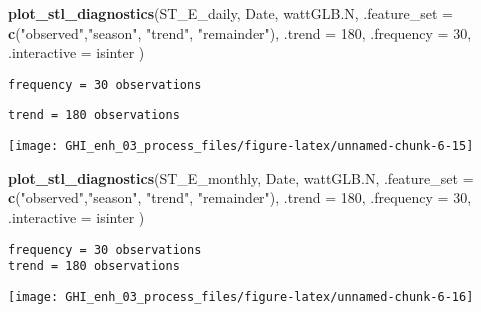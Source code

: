 \documentclass[
  10pt,
  a4paper,oneside]{article}
\newenvironment{Shaded}{\begin{snugshade}}{\end{snugshade}}
\newcommand{\AttributeTok}[1]{\textcolor[rgb]{0.13,0.29,0.53}{#1}}
\newcommand{\DecValTok}[1]{\textcolor[rgb]{0.00,0.00,0.81}{#1}}
\newcommand{\FunctionTok}[1]{\textcolor[rgb]{0.13,0.29,0.53}{\textbf{#1}}}
\newcommand{\NormalTok}[1]{#1}
\newcommand{\StringTok}[1]{\textcolor[rgb]{0.31,0.60,0.02}{#1}}
\begin{document}
\begin{Shaded}
\begin{Highlighting}[]
\FunctionTok{plot\_stl\_diagnostics}\NormalTok{(ST\_E\_daily, Date, wattGLB.N,}
                     \AttributeTok{.feature\_set =} \FunctionTok{c}\NormalTok{(}\StringTok{"observed"}\NormalTok{,}\StringTok{"season"}\NormalTok{, }\StringTok{"trend"}\NormalTok{, }\StringTok{"remainder"}\NormalTok{),}
                     \AttributeTok{.trend =} \DecValTok{180}\NormalTok{,}
                     \AttributeTok{.frequency =} \DecValTok{30}\NormalTok{,}
                     \AttributeTok{.interactive =}\NormalTok{ isinter}
\NormalTok{                     )}
\end{Highlighting}
\end{Shaded}

\begin{verbatim}
frequency = 30 observations
\end{verbatim}

\begin{verbatim}
trend = 180 observations
\end{verbatim}

\begin{center}\texttt{[image: GHI\_enh\_03\_process\_files/figure-latex/unnamed-chunk-6-15]} \end{center}

\begin{Shaded}
\begin{Highlighting}[]
\FunctionTok{plot\_stl\_diagnostics}\NormalTok{(ST\_E\_monthly, Date, wattGLB.N,}
                     \AttributeTok{.feature\_set =} \FunctionTok{c}\NormalTok{(}\StringTok{"observed"}\NormalTok{,}\StringTok{"season"}\NormalTok{, }\StringTok{"trend"}\NormalTok{, }\StringTok{"remainder"}\NormalTok{),}
                     \AttributeTok{.trend =} \DecValTok{180}\NormalTok{,}
                     \AttributeTok{.frequency =} \DecValTok{30}\NormalTok{,}
                     \AttributeTok{.interactive =}\NormalTok{ isinter}
\NormalTok{                     )}
\end{Highlighting}
\end{Shaded}

\begin{verbatim}
frequency = 30 observations
trend = 180 observations
\end{verbatim}

\begin{center}\texttt{[image: GHI\_enh\_03\_process\_files/figure-latex/unnamed-chunk-6-16]} \end{center}
\end{document}
